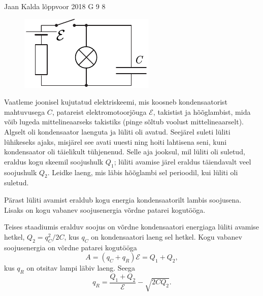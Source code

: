 {Jaan Kalda} %
{lõppvoor} %
{2018} %
{G 9} %
{8} %
{
\ifStatement
\begin{figure}
\vspace{-10pt}
\begin{center}
\includegraphics[width=\linewidth]{2018-v3g-09-LC-Q}
\par\end{center} 
\end{figure}

Vaatleme joonisel kujutatud elektriskeemi, mis koosneb kondensaatorist mahtuvusega $C$, patareist elektromotoorjõuga $\mathcal{E}$, takistist ja hõõglambist, mida võib lugeda mittelineaarseks takistiks (pinge sõltub voolust mittelineaarselt). Algselt oli kondensaator laenguta ja lüliti oli avatud. Seejärel suleti lüliti lühikeseks ajaks, misjärel see avati uuesti ning hoiti lahtisena seni, kuni kondensaator oli täielikult tühjenenud. Selle aja jooksul, mil lüliti oli suletud, eraldus kogu skeemil soojushulk $Q_1$; lüliti avamise järel eraldus täiendavalt veel soojushulk $Q_2$. Leidke laeng, mis läbis hõõglambi sel perioodil, kui lüliti oli suletud.
\fi


\ifHint
Pärast lüliti avamist eraldub kogu energia kondensaatorilt lambis soojusena. Lisaks on kogu vabanev soojusenergia võrdne patarei kogutööga.
\fi


\ifSolution
Teises staadiumis eralduv soojus on võrdne kondensaatori energiaga lüliti avamise hetkel, $Q_2=q_C^2/2C$, kus $q_C$ on kondensaatori laeng sel hetkel. Kogu vabanev soojusenergia on võrdne patarei kogutööga
\[
A=(q_C+q_R)\mathcal E=Q_1+Q_2,
\]
kus $q_R$ on otsitav lampi läbiv laeng. Seega
\[
q_R=\frac{Q_1+Q_2}{\mathcal E}-\sqrt{2CQ_2}.
\]
\fi


}
